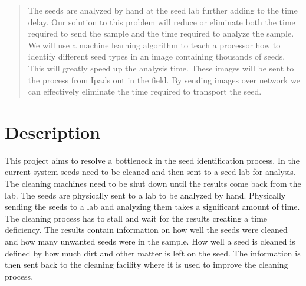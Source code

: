 \documentclass[onecolumn, draftclsnofoot,10pt, compsoc]{IEEEtran}
\begin{document}
\begin{titlepage}
\begin{singlespace}
\begin{abstract}
	The seeds are analyzed by hand at the seed lab further adding to the time delay.
	Our solution to this problem will reduce or eliminate both the time required to send the sample and the time required to analyze the sample.
	We will use a machine learning algorithm to teach a processor how to identify different seed types in an image containing thousands of seeds.
	This will greatly speed up the analysis time.
	These images will be sent to the process from Ipads out in the field.
	By sending images over network we can effectively eliminate the time required to transport the seed.
        \end{abstract}     
    \end{singlespace}
\end{titlepage}
\newpage
{}
\tableofcontents
\clearpage

\section{Description}
This project aims to resolve a bottleneck in the seed identification process.
In the current system seeds need to be cleaned and then sent to a seed lab for analysis.
The cleaning machines need to be shut down until the results come back from the lab.
The seeds are physically sent to a lab to be analyzed by hand.
Physically sending the seeds to a lab and analyzing them takes a significant amount of time.
The cleaning process has to stall and wait for the results creating a time deficiency.
The results contain information on how well the seeds were cleaned and how many unwanted seeds were in the sample.
How well a seed is cleaned is defined by how much dirt and other matter is left on the seed.
The information is then sent back to the cleaning facility where it is used to improve the cleaning process.
\end{document}
